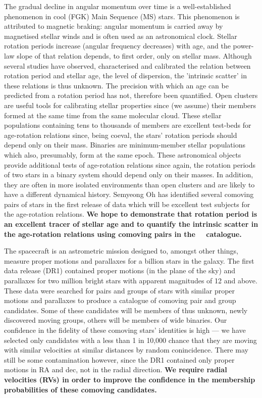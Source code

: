 \justification
The gradual decline in angular momentum over time is a well-established
phenomenon in cool (FGK) Main Sequence (MS) stars.
This phenomenon is attributed to magnetic braking: angular momentum is carried
away by magnetised stellar winds and is often used as an astronomical clock.
Stellar rotation periods increase (angular frequency decreases) with age, and
the power-law slope of that relation depends, to first order, only on stellar
mass.
Although several studies have observed, characterised and calibrated the
relation between rotation period and stellar age, the level of dispersion, the
'intrinsic scatter' in these relations is thus unknown.
The precision with which an age can be predicted from a rotation period has
not, therefore been quantified.
Open clusters are useful tools for calibrating stellar properties since (we
assume) their members formed at the same time from the same molecular cloud.
These stellar populations containing tens to thousands of members are
excellent test-beds for age-rotation relations since, being coeval, the stars'
rotation periods should depend only on their mass.
Binaries are minimum-member stellar populations which also, presumably, form
at the same epoch.
These astronomical objects provide additional tests of age-rotation relations
since again, the rotation periods of two stars in a binary system should
depend only on their masses.
In addition, they are often in more isolated environments than open clusters
and are likely to have a different dynamical history.
Semyeong Oh has identified several comoving pairs of stars in the first
release of \gaia data which will be excellent test subjects for the
age-rotation relations.
{\bf We hope to demonstrate that rotation period is an excellent tracer of
stellar age and to quantify the intrinsic scatter in the age-rotation
relations using comoving pairs in the \Gaia\ \TGAS\ catalogue.}


The \gaia spacecraft is an astrometric mission designed to, amongst other
things, measure proper motions and parallaxes for a billion stars in the
galaxy.
The first data release (DR1) contained proper motions (in the plane of the
sky) and parallaxes for two million bright stars with apparent magnitudes of
12 and above.
These data were searched for pairs and groups of stars with similar proper
motions and parallaxes to produce a catalogue of comoving pair and group
candidates.
Some of these candidates will be members of thus unknown, newly discovered
moving groups, others will be members of wide binaries.
Our confidence in the fidelity of these comoving stars' identities is
high --- we have selected only candidates with a less than 1 in 10,000 chance
that they are moving with similar velocities at similar distances by random
conincidence.
There may still be some contamination however, since the \gaia DR1 contained
only proper motions in RA and dec, not in the radial direction.
{\bf We require radial velocities (RVs) in order to improve the confidence in
the membership probabilities of these comoving candidates.}

